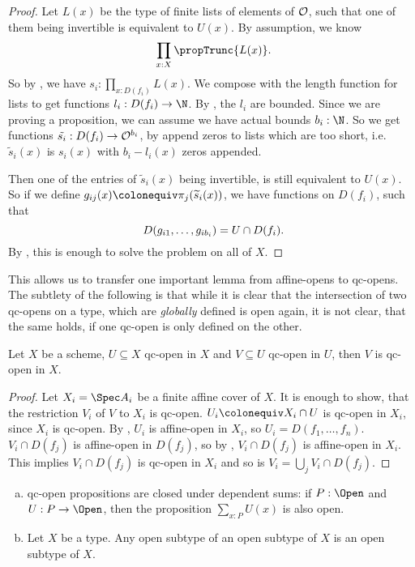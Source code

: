 \begin{proof}
  Let $L(x)$ be the type of finite lists of elements of $\mathcal O$,
  such that one of them being invertible is equivalent to $U(x)$.
  By assumption, we know
  \[\prod_{x:X}\propTrunc{L(x)}\rlap{.}\]
  So by , we have $s_i:\prod_{x:D(f_i)}L(x)$.
  We compose with the length function for lists to get functions $l_i:D(f_i)\to\N$.
  By , the $l_i$ are bounded.
  Since we are proving a proposition, we can assume we have actual bounds $b_i:\N$.
  So we get functions $\tilde{s_i}:D(f_i)\to \mathcal O^{b_i}$,
  by append zeros to lists which are too short,
  i.e. $\widetilde{s}_i(x)$ is $s_i(x)$ with $b_i-l_i(x)$ zeros appended.

  Then one of the entries of $\widetilde{s}_i(x)$ being invertible,
  is still equivalent to $U(x)$.
  So if we define $g_{ij}(x)\colonequiv \pi_j(\widetilde{s}_i(x))$,
  we have functions on $D(f_i)$, such that
  \[
    D(g_{i1},\dots,g_{ib_i})=U\cap D(f_i)
    \rlap{.}
  \]
  By , this is enough to solve the problem on all of $X$.
\end{proof}

This allows us to transfer one important lemma from affine-opens to qc-opens.
The subtlety of the following is that while it is clear that the intersection of two
qc-opens on a type, which are \emph{globally} defined is open again, it is not clear,
that the same holds, if one qc-open is only defined on the other.

\begin{lemma}%
  \label{qc-open-trans}
  Let $X$ be a scheme, $U\subseteq X$ qc-open in $X$ and $V\subseteq U$ qc-open in $U$,
  then $V$ is qc-open in $X$.
\end{lemma}

\begin{proof}
  Let $X_i=\Spec A_i$ be a finite affine cover of $X$.
  It is enough to show, that the restriction $V_i$ of $V$ to $X_i$ is qc-open.
  $U_i\colonequiv X_i\cap U$ is qc-open in $X_i$, since $X_i$ is qc-open.
  By , $U_i$ is affine-open in $X_i$,
  so $U_i=D(f_1,\dots,f_n)$.
  $V_i\cap D(f_j)$ is affine-open in $D(f_j)$, so by ,
  $V_i\cap D(f_j)$ is affine-open in $X_i$.
  This implies $V_i\cap D(f_j)$ is qc-open in $X_i$ and so is $V_i=\bigcup_{j}V_i\cap D(f_j)$.
\end{proof}

\begin{lemma}%
  \label{qc-open-sigma-closed}
  \begin{enumerate}[(a)]
  \item qc-open propositions are closed under dependent sums:
    if $P : \Open$ and $U : P \to \Open$,
    then the proposition $\sum_{x : P} U(x)$ is also open.
  \item Let $X$ be a type. Any open subtype of an open subtype of $X$ is an open subtype of $X$.
  \end{enumerate}
\end{lemma}


